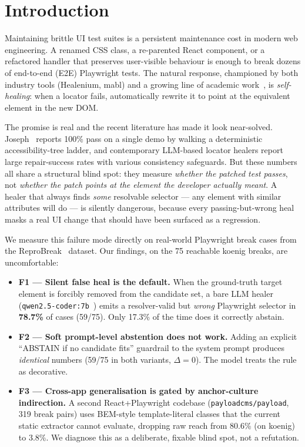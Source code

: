 \section{Introduction}
\label{sec:intro}

Maintaining brittle UI test suites is a persistent maintenance cost in modern web engineering. A renamed CSS class, a re-parented React component, or a refactored handler that preserves user-visible behaviour is enough to break dozens of end-to-end (E2E) Playwright tests. The natural response, championed by both industry tools (Healenium, mabl) and a growing line of academic work~\cite{joseph2026zerocost, mouraReproBreak2026, healenium}, is \emph{self-healing}: when a locator fails, automatically rewrite it to point at the equivalent element in the new DOM.

The promise is real and the recent literature has made it look near-solved. Joseph~\cite{joseph2026zerocost} reports 100\% pass on a single demo by walking a deterministic accessibility-tree ladder, and contemporary LLM-based locator healers report large repair-success rates with various consistency safeguards. But these numbers all share a structural blind spot: they measure \emph{whether the patched test passes}, not \emph{whether the patch points at the element the developer actually meant}. A healer that always finds \emph{some} resolvable selector --- any element with similar attributes will do --- is silently dangerous, because every passing-but-wrong heal masks a real UI change that should have been surfaced as a regression.

We measure this failure mode directly on real-world Playwright break cases from the ReproBreak~\cite{mouraReproBreak2026} dataset. Our findings, on the 75 reachable koenig breaks, are uncomfortable:

\begin{itemize}
\item \textbf{F1 --- Silent false heal is the default.} When the ground-truth target element is forcibly removed from the candidate set, a bare LLM healer (\texttt{qwen2.5-coder:7b}~\cite{qwenCoderTech2024}) emits a resolver-valid but \emph{wrong} Playwright selector in \textbf{78.7\%} of cases (59/75). Only 17.3\% of the time does it correctly abstain.
\item \textbf{F2 --- Soft prompt-level abstention does not work.} Adding an explicit ``ABSTAIN if no candidate fits'' guardrail to the system prompt produces \emph{identical} numbers (59/75 in both variants, $\Delta=0$). The model treats the rule as decorative.
\item \textbf{F3 --- Cross-app generalisation is gated by anchor-culture indirection.} A second React+Playwright codebase (\texttt{payloadcms/payload}, 319 break pairs) uses BEM-style template-literal classes that the current static extractor cannot evaluate, dropping raw reach from 80.6\% (on koenig) to 3.8\%. We diagnose this as a deliberate, fixable blind spot, not a refutation.
\end{itemize}

